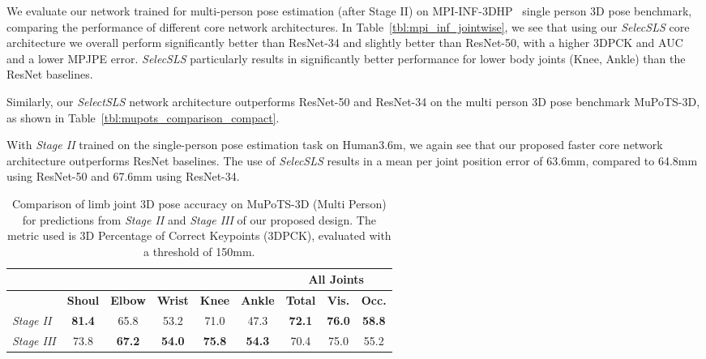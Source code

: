 \documentclass[acmtog,authorversion]{acmart}
\begin{document}
We evaluate our network trained for multi-person pose estimation (after Stage II) on MPI-INF-3DHP~\cite{mehta_mono_3dv17} single person 3D pose benchmark, comparing the performance of different core network architectures.
In Table~\ref{tbl:mpi_inf_jointwise}, we see that using our \textit{SelecSLS} core architecture we overall perform significantly better than ResNet-34 and slightly better than ResNet-50, with a higher 3DPCK and AUC and a lower MPJPE error. \textit{SelecSLS} particularly results in significantly better performance for lower body joints (Knee, Ankle) than the ResNet baselines.

Similarly, our \textit{SelectSLS} network architecture outperforms ResNet-50 and ResNet-34 on the multi person 3D pose benchmark MuPoTS-3D, as shown in Table~\ref{tbl:mupots_comparison_compact}. 

With \textit{Stage II} trained on the single-person pose estimation task on Human3.6m, we again see that our proposed faster core network architecture outperforms ResNet baselines. The use of \textit{SelecSLS} results in a mean per joint position error of 63.6mm, compared to 64.8mm using ResNet-50 and 67.6mm using ResNet-34.


\begin{table}[]
\renewcommand{\tabcolsep}{1.5pt}
\centering
\caption{Comparison of limb joint 3D pose accuracy on MuPoTS-3D (Multi Person) for predictions from \textit{Stage II} and \textit{Stage III} of our proposed design.
The metric used is 3D Percentage of Correct Keypoints (3DPCK), evaluated with a threshold of 150mm.}
\vspace{-0.2cm}
\begin{tabular}{l|c|c|c|c|c||c|c|c}

\multicolumn{6}{l||}{}     &  \multicolumn{3}{c}{\textbf{All Joints}} \\ \hline
\multicolumn{1}{l|}{}     & \textbf{Shoul} &\textbf{Elbow} & \textbf{Wrist} & \textbf{Knee} & \textbf{Ankle} & \textbf{Total} &\textbf{Vis.}&\textbf{Occ.}  \\ \hline
\textit{Stage II}        &\textbf{81.4}          & 65.8           & 53.2           & 71.0         & 47.3           & \textbf{72.1}  &\textbf{76.0} &\textbf{58.8} \\ 
\textit{Stage III}       &{73.8}           & \textbf{67.2}           & \textbf{54.0}           & \textbf{75.8}          & \textbf{54.3}          & {70.4}  &{75.0} &55.2 \\ \hline
\end{tabular} \label{tbl:mupots_jointwise_comparison}
\vspace{-0.3cm}
\end{table}
\end{document}
